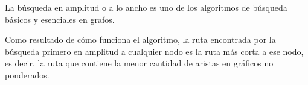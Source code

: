 La búsqueda en amplitud o a lo ancho es uno de los algoritmos de búsqueda básicos y esenciales en grafos.

Como resultado de cómo funciona el algoritmo, la ruta encontrada por la búsqueda primero en amplitud a cualquier nodo es la ruta más corta a ese nodo, es decir, la ruta que contiene la menor cantidad de aristas en gráficos no ponderados.